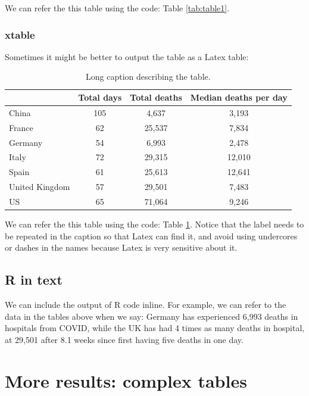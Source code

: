\documentclass[12pt,]{book}
\begin{document}
We can refer the this table using the code: Table \ref{tab:table1}.

\pagebreak

\hypertarget{xtable}{%
\subsection{xtable}\label{xtable}}

Sometimes it might be better to output the table as a Latex table:

\begin{table}[ht]
\centering
\begingroup\fontsize{12pt}{12pt}\selectfont
\begin{tabular}{lccc}
  \toprule
 & Total days & Total deaths & Median deaths per day \\ 
  \midrule
China & 105 &  4,637 &  3,193 \\ 
  France &  62 & 25,537 &  7,834 \\ 
  Germany &  54 &  6,993 &  2,478 \\ 
  Italy &  72 & 29,315 & 12,010 \\ 
  Spain &  61 & 25,613 & 12,641 \\ 
  United Kingdom &  57 & 29,501 &  7,483 \\ 
  US &  65 & 71,064 &  9,246 \\ 
   \bottomrule
\end{tabular}
\endgroup
\caption[xtable: short caption for LoT]{\label{tab:table1xtable} Long caption describing the table.} 
\end{table}

We can refer the this table using the code: Table \ref{tab:table1xtable}.
Notice that the label needs to be repeated in the caption so that Latex can find it, and avoid using undercores or dashes in the names because Latex is very sensitive about it.

\hypertarget{r-in-text}{%
\section{R in text}\label{r-in-text}}

We can include the output of R code inline.
For example, we can refer to the data in the tables above when we say: Germany has experienced 6,993 deaths in hospitals from COVID, while the UK has had 4 times as many deaths in hospital, at 29,501 after 8.1 weeks since first having five deaths in one day.

\hypertarget{chapter5}{%
\chapter{More results: complex tables}\label{chapter5}}
\end{document}
